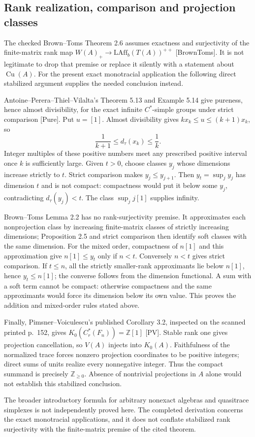\documentclass[10pt]{article}
\begin{document}
\subsection*{Rank realization, comparison and projection classes}
The checked Brown–Toms Theorem 2.6 assumes exactness and surjectivity of the finite-matrix rank map \(W(A)_+\to\mathrm{LAff}_b(T(A))^{++}\) [BrownToms]. It is not legitimate to drop that premise or replace it silently with a statement about \(\operatorname{Cu}(A)\). For the present exact monotracial application the following direct stabilized argument supplies the needed conclusion instead.\par
Antoine–Perera–Thiel–Vilalta’s Theorem 5.13 and Example 5.14 give pureness, hence almost divisibility, for the exact infinite \(C^*\)-simple groups under strict comparison [Pure]. Put \(u=[1]\). Almost divisibility gives \(kx_k\le u\le(k+1)x_k\), so \[\frac1{k+1}\le d_\tau(x_k)\le\frac1k .\] Integer multiples of these positive numbers meet any prescribed positive interval once \(k\) is sufficiently large. Given \(t>0\), choose classes \(y_j\) whose dimensions increase strictly to \(t\). Strict comparison makes \(y_j\le y_{j+1}\). Then \(y_t=\sup_jy_j\) has dimension \(t\) and is not compact: compactness would put it below some \(y_j\), contradicting \(d_\tau(y_j)<t\). The class \(\sup_jj[1]\) supplies infinity.\par
Brown–Toms Lemma 2.2 has no rank-surjectivity premise. It approximates each nonprojection class by increasing finite-matrix classes of strictly increasing dimensions; Proposition 2.5 and strict comparison then identify soft classes with the same dimension. For the mixed order, compactness of \(n[1]\) and this approximation give \(n[1]\le y_t\) only if \(n<t\). Conversely \(n<t\) gives strict comparison. If \(t\le n\), all the strictly smaller-rank approximants lie below \(n[1]\), hence \(y_t\le n[1]\); the converse follows from the dimension functional. A sum with a soft term cannot be compact: otherwise compactness and the same approximants would force its dimension below its own value. This proves the addition and mixed-order rules stated above.\par
Finally, Pimsner–Voiculescu’s published Corollary 3.2, inspected on the scanned printed p. 152, gives \(K_0(C_r^*(F_n))=\mathbb Z[1]\) [PV]. Stable rank one gives projection cancellation, so \(V(A)\) injects into \(K_0(A)\). Faithfulness of the normalized trace forces nonzero projection coordinates to be positive integers; direct sums of units realize every nonnegative integer. Thus the compact summand is precisely \(\mathbb Z_{\ge0}\). Absence of nontrivial projections in \(A\) alone would not establish this stabilized conclusion.\par
The broader introductory formula for arbitrary nonexact algebras and quasitrace simplexes is not independently proved here. The completed derivation concerns the exact monotracial applications, and it does not conflate stabilized rank surjectivity with the finite-matrix premise of the cited theorem.\par
\end{document}
